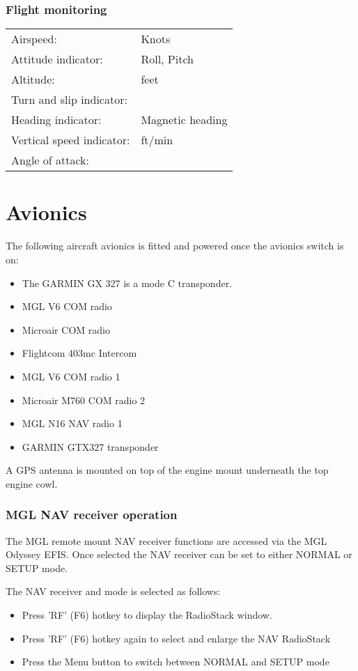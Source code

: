 \subsubsection{Flight monitoring}
  \begin{tabularx}{\linewidth}{
    >{\hsize=0.4\hsize}X
    >{\hsize=0.6\hsize}X  }
Airspeed: & Knots\\
Attitude indicator: & Roll, Pitch\\
Altitude: & feet\\
Turn and slip indicator: & \\
Heading indicator: & Magnetic heading\\
Vertical speed indicator: & ft/min\\
Angle of attack: & \\
\end{tabularx}

\section{Avionics}
The following aircraft avionics is fitted and powered once the avionics switch is on:
\begin{itemize}
\item The GARMIN GX 327 is a mode C transponder.
\item MGL V6 COM radio
\item Microair COM radio
\item Flightcom 403mc Intercom 
\item MGL V6 COM radio 1
\item Microair M760 COM radio 2
\item MGL N16 NAV radio 1
\item GARMIN GTX327 transponder
\end{itemize}

A GPS antenna is mounted on top of the engine mount underneath the top engine cowl.  

\subsubsection{MGL NAV receiver operation}
The MGL remote mount NAV receiver functions are accessed via the MGL Odyssey EFIS.  Once selected the NAV receiver can be set to either NORMAL or SETUP mode.  

The NAV receiver and mode is selected as follows:
\begin{itemize}
\item Press 'RF' (F6) hotkey to display the RadioStack window.
\item Press 'RF' (F6) hotkey again to select and enlarge the NAV RadioStack
\item Press the Menu button to switch between NORMAL and SETUP mode
\end{itemize}

